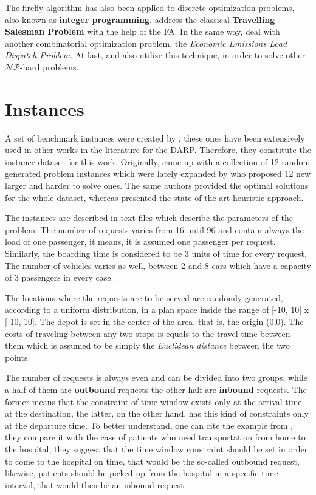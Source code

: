 \documentclass[tuberlin,cic,tc,openright,english,noabntcite,oneside]{iiufrgs}
\begin{document}
The firefly algorithm has also been applied to discrete optimization problems, also known as \textbf{integer programming}. \textcite{jati_evolutionary_2011} address the classical \textbf{Travelling Salesman Problem} with the help of the FA. In the same way, \textcite{apostolopoulos_application_2010} deal with another combinatorial optimization problem, the \emph{Economic Emissions Load Dispatch Problem}. At last, \textcite{sayadi_discrete_2010} and \textcite{sayadi_firefly-inspired_2013} also utilize this technique, in order to solve other $\mathcal{NP}$-hard problems.

\section{Instances}
A set of benchmark instances were created by \textcite{cordeau_branch-and-cut_2006}, these ones have been extensively used in other works in the literature for the DARP. Therefore, they constitute the instance dataset for this work. Originally, \textcite{cordeau_branch-and-cut_2006} came up with a collection of 12 random generated problem instances which were lately expanded by \textcite{ropke_models_2007} who proposed 12 new larger and harder to solve ones. The same authors provided the optimal solutions for the whole dataset, whereas \textcite{parragh_hybrid_2013} presented the state-of-the-art heuristic approach.

The instances are described in text files which describe the parameters of the problem. The number of requests varies from 16 until 96 and contain always the load of one passenger, it means, it is assumed one passenger per request. Similarly, the boarding time is considered to be 3 units of time for every request. The number of vehicles varies as well, between 2 and 8 cars which have a capacity of 3 passengers in every case.

The locations where the requests are to be served are randomly generated, according to a uniform distribution, in a plan space inside the range of [-10, 10] x [-10, 10]. The depot is set in the center of the area, that is, the origin (0,0). The costs of traveling between any two stops is equals to the travel time between them which is assumed to be simply the \emph{Euclidean distance} between the two points.

The number of requests is always even and can be divided into two groups, while a half of them are \textbf{outbound} requests the other half are \textbf{inbound} requests. The former means that the constraint of time window exists only at the arrival time at the destination, the latter, on the other hand, has this kind of constraints only at the departure time. To better understand, one can cite the example from \textcite[p. 29]{cordeau_dial--ride_2007}, they compare it with the case of patients who need transportation from home to the hospital, they suggest that the time window constraint should be set in order to come to the hospital on time, that would be the so-called outbound request, likewise, patients should be picked up from the hospital in a specific time interval, that would then be an inbound request.
\end{document}

